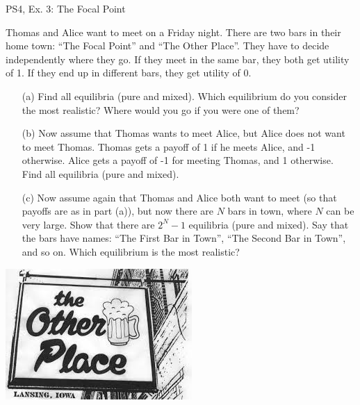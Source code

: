 \begin{frame}{PS4, Ex. 3: The Focal Point}
  \begin{multicols}{2}
    Thomas and Alice want to meet on a Friday night. There are two bars in their home town: “The Focal Point” and “The Other Place”. They have to decide independently where they go. If they meet in the same bar, they both get utility of 1. If they end up in different bars, they get utility of 0.
    \begin{itemize}
      \item[(a)] Find all equilibria (pure and mixed). Which equilibrium do you consider the most realistic? Where would you go if you were one of them?
      \item[(b)] Now assume that Thomas wants to meet Alice, but Alice does not want to meet Thomas. Thomas gets a payoff of 1 if he meets Alice, and -1 otherwise. Alice gets a payoff of -1 for meeting Thomas, and 1 otherwise. Find all equilibria (pure and mixed).
    \end{itemize}
  \vfill\null \columnbreak
  \begin{itemize}
    \item[(c)] Now assume again that Thomas and Alice both want to meet (so that payoffs are as in part (a)), but now there are $N$ bars in town, where $N$ can be very large. Show that there are $2^N-1$ equilibria (pure and mixed). Say that the bars have names: “The First Bar in Town”, “The Second Bar in Town”, and so on. Which equilibrium is the most realistic?
  \end{itemize}
  \includegraphics[width=\columnwidth]{figures/other_place}
  \vfill\null
  \end{multicols}
\end{frame}
